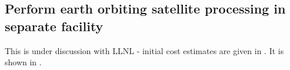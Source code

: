 \subsection{Perform earth orbiting satellite processing in separate facility} \label{sec:5perform}

This is under discussion with \gls{LLNL} - initial cost estimates are given in .
It is shown in .

